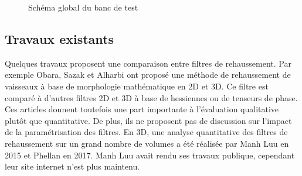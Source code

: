 \begin{figure}[h]
  \centering
  \caption{Schéma global du banc de test}
  \label{fig:schéma banc de test}
\end{figure}

\subsection{Travaux existants}

 Quelques travaux proposent une comparaison entre filtres de rehaussement. Par exemple Obara, Sazak et Alharbi \cite{Sazak2019_bowler_hat_2D} \cite{Alharbi2018_TP_2D_3D} ont proposé une méthode de rehaussement de vaisseaux à base de morphologie mathématique en 2D et 3D. Ce filtre est comparé à d'autres filtres 2D et 3D à base de hessiennes ou de tenseurs de phase. Ces articles donnent toutefois une part importante à l'évaluation qualitative plutôt que quantitative. De plus, ils ne proposent pas de discussion sur l'impact de la paramétrisation des filtres. En 3D, une analyse quantitative des filtres de rehaussement sur un grand nombre de volumes a été réalisée par Manh Luu en 2015 \cite{Luu2015_liver_vesselness_comparison} et Phellan \cite{Phellan2017_Brain_vesselness_comparison} en 2017. Manh Luu avait rendu ses travaux publique, cependant leur site internet n'est plus maintenu.

